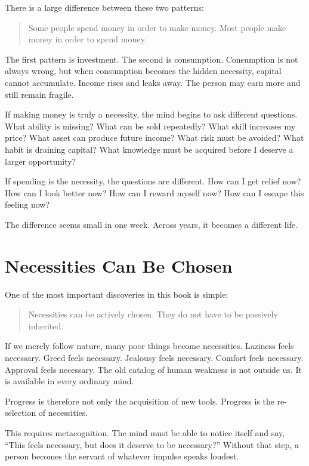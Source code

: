 There is a large difference between these two patterns:

\begin{quote}
Some people spend money in order to make money. Most people make money in order to spend money.
\end{quote}

The first pattern is investment. The second is consumption. Consumption is not always wrong, but when consumption becomes the hidden necessity, capital cannot accumulate. Income rises and leaks away. The person may earn more and still remain fragile.

If making money is truly a necessity, the mind begins to ask different questions. What ability is missing? What can be sold repeatedly? What skill increases my price? What asset can produce future income? What risk must be avoided? What habit is draining capital? What knowledge must be acquired before I deserve a larger opportunity?

If spending is the necessity, the questions are different. How can I get relief now? How can I look better now? How can I reward myself now? How can I escape this feeling now?

The difference seems small in one week. Across years, it becomes a different life.

\section*{Necessities Can Be Chosen}

One of the most important discoveries in this book is simple:

\begin{quote}
Necessities can be actively chosen. They do not have to be passively inherited.
\end{quote}

If we merely follow nature, many poor things become necessities. Laziness feels necessary. Greed feels necessary. Jealousy feels necessary. Comfort feels necessary. Approval feels necessary. The old catalog of human weakness is not outside us. It is available in every ordinary mind.

Progress is therefore not only the acquisition of new tools. Progress is the re-selection of necessities.

This requires metacognition. The mind must be able to notice itself and say, ``This feels necessary, but does it deserve to be necessary?'' Without that step, a person becomes the servant of whatever impulse speaks loudest.

